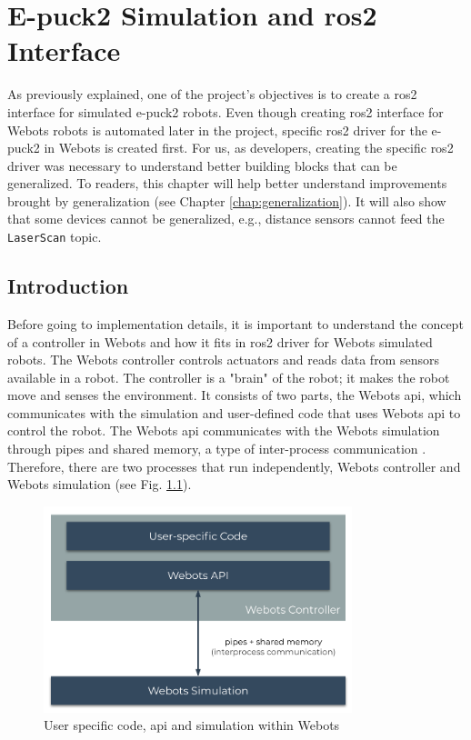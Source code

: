 \chapter{E-puck2 Simulation and \acs{ros2} Interface}
\label{chap:simulation}

As previously explained, one of the project's objectives is to create a \ac{ros2} interface for simulated e-puck2 robots.
Even though creating \ac{ros2} interface for Webots robots is automated later in the project, specific \ac{ros2} driver for the e-puck2 in Webots is created first.
For us, as developers, creating the specific \ac{ros2} driver was necessary to understand better building blocks that can be generalized.
To readers, this chapter will help better understand improvements brought by generalization (see Chapter \ref{chap:generalization}).
It will also show that some devices cannot be generalized, e.g., distance sensors cannot feed the \texttt{LaserScan} topic.

\section{Introduction}

Before going to implementation details, it is important to understand the concept of a controller in Webots and how it fits in \ac{ros2} driver for Webots simulated robots.
The Webots controller controls actuators and reads data from sensors available in a robot.
The controller is a "brain" of the robot; it makes the robot move and senses the environment.
It consists of two parts, the Webots \ac{api}, which communicates with the simulation and user-defined code that uses Webots \ac{api} to control the robot.
The Webots \ac{api} communicates with the Webots simulation through pipes and shared memory, a type of inter-process communication \cite{kashyian_portable_2008}.
Therefore, there are two processes that run independently, Webots controller and Webots simulation (see Fig. \ref{fig:simulation:webots_user_code_and_api}).

\begin{figure}[H]
    \centering
    \includegraphics[width=0.8\textwidth]{simulation/figures/webots_user_code_and_api.pdf}
    \caption{User specific code, \ac{api} and simulation within Webots}
    \label{fig:simulation:webots_user_code_and_api}
\end{figure}

